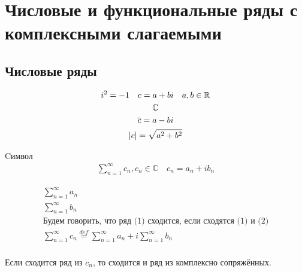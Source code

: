 \documentclass[main]{subfiles}
\begin{document}
\chapter{Числовые и функциональные ряды с комплексными слагаемыми}
\section{Числовые ряды}
\begin{gather*}
    i^2 = -1 \quad c = a + bi \quad a,b \in \mathbb{R} \\
    \mathbb{C}\\
    \overline{c} = a -bi \\
    |c| = \sqrt{a^2 + b^2}
\end{gather*}
\begin{definition}
     Cимвол \begin{gather*}
        \sum_{n=1}^\infty c_n , c_n \in \mathbb{C} \quad c_n = a_n + ib_n \tag{1}
    \end{gather*}
\end{definition}

\begin{definition}[Сходимость]
    \begin{gather*}
    \sum^\infty_{n=1} a_n \tag{2}\\
    \sum^\infty_{n=1} b_n \tag{3}\\
    \text{Будем говорить, что ряд (1) сходится, если сходятся (1) и (2)} \\
    \sum^\infty_{n=1} c_n \stackrel{def}{=} \sum^\infty_{n=1} a_n + i \sum^\infty_{n=1} b_n \tag{4}\\
    \end{gather*}
\end{definition}
Если сходится ряд из $c_n$, то сходится и ряд из комплексно сопряжённых. 
\end{document}
